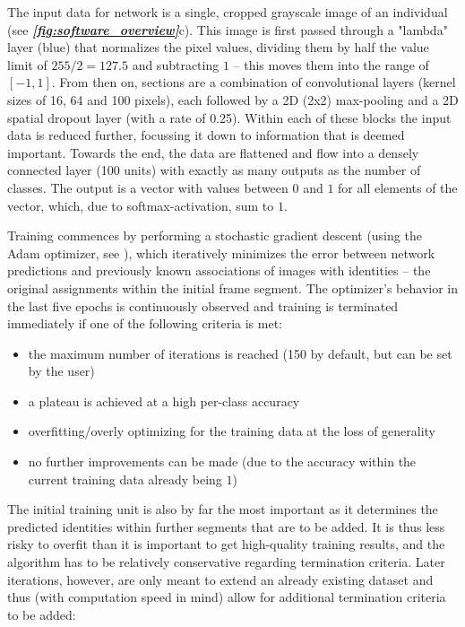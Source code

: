 \documentclass[9pt,lineno]{elife}
\newcommand{\figref}[1]{\textit{\textbf{\ref{#1}}}}
\newcommand{\TRex}{\protect\path{TRex}}
\begin{document}
The input data for \TRex{'} network is a single, cropped grayscale image of an individual (see \figref{fig:software_overview}c). This image is first passed through a "lambda" layer (blue) that normalizes the pixel values, dividing them by half the value limit of $255 / 2 = 127.5$ and subtracting $1$ -- this moves them into the range of $[-1,1]$. From then on, sections are a combination of convolutional layers (kernel sizes of 16, 64 and 100 pixels), each followed by a 2D (2x2) max-pooling and a 2D spatial dropout layer (with a rate of 0.25). Within each of these blocks the input data is reduced further, focussing it down to information that is deemed important. Towards the end, the data are flattened and flow into a densely connected layer (100 units) with exactly as many outputs as the number of classes. The output is a vector with values between $0$ and $1$ for all elements of the vector, which, due to softmax-activation, sum to $1$.

Training commences by performing a stochastic gradient descent (using the Adam optimizer, see \citealt{kingma2014adam}), which iteratively minimizes the error between network predictions and previously known associations of images with identities -- the original assignments within the initial frame segment. The optimizer's behavior in the last five epochs is continuously observed and training is terminated immediately if one of the following criteria is met:

\begin{itemize}[label=\textnormal{$\bullet$}]
\item the maximum number of iterations is reached (150 by default, but can be set by the user)
\item a plateau is achieved at a high per-class accuracy
\item overfitting/overly optimizing for the training data at the loss of generality
\item no further improvements can be made (due to the accuracy within the current training data already being $1$)
\end{itemize}

The initial training unit is also by far the most important as it determines the predicted identities within further segments that are to be added. It is thus less risky to overfit than it is important to get high-quality training results, and the algorithm has to be relatively conservative regarding termination criteria. Later iterations, however, are only meant to extend an already existing dataset and thus (with computation speed in mind) allow for additional termination criteria to be added:
\end{document}

